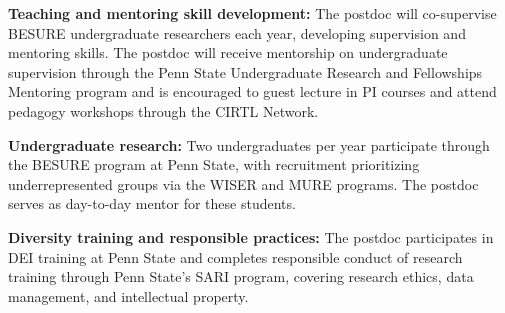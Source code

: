 \documentclass[11pt]{article}
\begin{document}
\vspace{0.1cm}
\noindent \textbf{Teaching and mentoring skill development:}
The postdoc will co-supervise BESURE undergraduate researchers each year,
developing supervision and mentoring skills. The postdoc will receive
mentorship on undergraduate supervision through the Penn State Undergraduate
Research and Fellowships Mentoring program and is encouraged to guest lecture
in PI courses and attend pedagogy workshops through the CIRTL Network.

\vspace{0.1cm}
\noindent \textbf{Undergraduate research:}
Two undergraduates per year participate through the BESURE program at Penn State,
with recruitment prioritizing underrepresented groups via the WISER and MURE
programs. The postdoc serves as day-to-day mentor for these students.

\vspace{0.1cm}
\noindent \textbf{Diversity training and responsible practices:}
The postdoc participates in DEI training at Penn State and completes responsible
conduct of research training through Penn State's SARI program, covering research
ethics, data management, and intellectual property.
\end{document}
